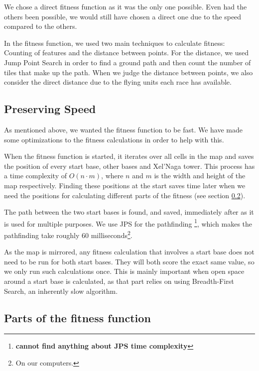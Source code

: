We chose a direct fitness function as it was the only one possible. Even had the others been possible, we would still have chosen a direct one due to the speed compared to the others. 

In the fitness function, we used two main techniques to calculate fitness: Counting of features and the distance between points. For the distance, we used Jump Point Search\cite{harabor11a, harabor12, Podhraski2013jps} in order to find a ground path and then count the number of tiles that make up the path. When we judge the distance between points, we also consider the direct distance due to the flying units each race has available.

\subsection{Preserving Speed}
\label{methodology_mapfitness_speed}

As mentioned above, we wanted the fitness function to be fast. We have made some optimizations to the fitness calculations in order to help with this.

When the fitness function is started, it iterates over all cells in the map and saves the position of every start base, other bases and Xel'Naga tower. This process has a time complexity of $O(n\cdot m)$, where $n$ and $m$ is the width and height of the map respectively. Finding these positions at the start saves time later when we need the positions for calculating different parts of the fitness (see section \ref{methodology_mapfitness_parts}).

The path between the two start bases is found, and saved, immediately after as it is used for multiple purposes. We use JPS for the pathfinding \footnote{\textbf{cannot find anything about JPS time complexity}}, which makes the pathfinding take roughly 60 milliseconds\footnote{On our computers.}.

As the map is mirrored, any fitness calculation that involves a start base does not need to be run for both start bases. They will both score the exact same value, so we only run such calculations once. This is mainly important when open space around a start base is calculated, as that part relies on using Breadth-First Search, an inherently slow algorithm.

\subsection{Parts of the fitness function}
\label{methodology_mapfitness_parts}

